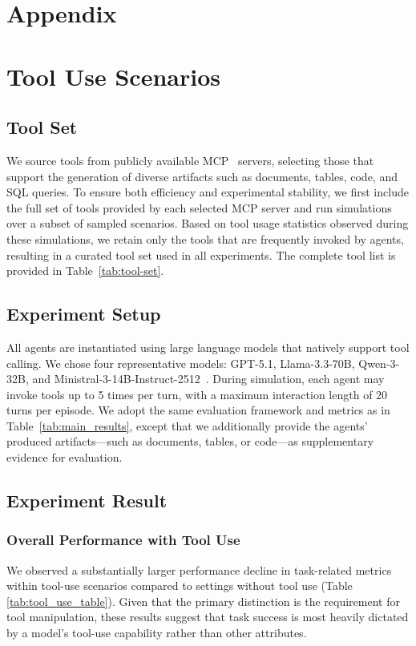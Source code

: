 \appendix
\clearpage

\section*{Appendix}

\section{Tool Use Scenarios}
\label{appendix:tool_use_task}

\subsection{Tool Set}
\label{app:full_tool_set}
We source tools from publicly available MCP~\citep{anthropic2024modelcontextprotocol} servers, selecting those that support the generation of diverse artifacts such as documents, tables, code, and SQL queries. To ensure both efficiency and experimental stability, we first include the full set of tools provided by each selected MCP server and run simulations over a subset of sampled scenarios. Based on tool usage statistics observed during these simulations, we retain only the tools that are frequently invoked by agents, resulting in a curated tool set used in all experiments. The complete tool list is provided in Table~\ref{tab:tool-set}.


\subsection{Experiment Setup}
\label{app:experiment_setup}
All agents are instantiated using large language models that natively support tool calling. We chose four representative models: GPT-5.1, Llama-3.3-70B, Qwen-3-32B, and Ministral-3-14B-Instruct-2512~\citep{ministral3_14b}. During simulation, each agent may invoke tools up to 5 times per turn, with a maximum interaction length of 20 turns per episode. We adopt the same evaluation framework and metrics as in Table~\ref{tab:main_results}, except that we additionally provide the agents’ produced artifacts—such as documents, tables, or code—as supplementary evidence for evaluation.





\subsection{Experiment Result}
\subsubsection{Overall Performance with Tool Use}
We observed a substantially larger performance decline in task-related metrics within tool-use scenarios compared to settings without tool use (Table \ref{tab:tool_use_table}). Given that the primary distinction is the requirement for tool manipulation, these results suggest that task success is most heavily dictated by a model’s tool-use capability rather than other attributes.

